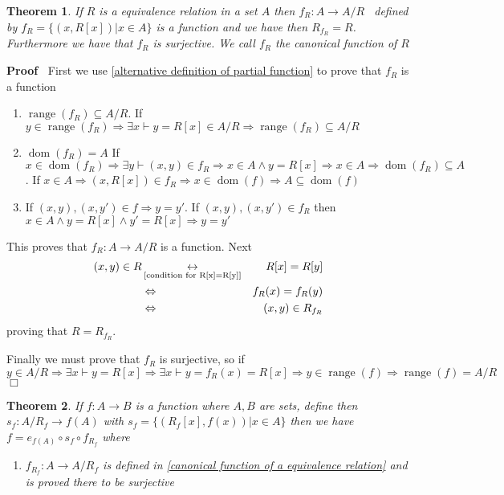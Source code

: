\documentclass{book}
\newcommand{\Leftrightarrowlim}{\mathop{\leftrightarrow}\limits}
\newcommand{\nobracket}{}
\newcommand{\tmop}[1]{\ensuremath{\operatorname{#1}}}
\newenvironment{proof}{\noindent\textbf{Proof\ }}{\hspace*{\fill}$\Box$\medskip}
\newtheorem{theorem}{Theorem}
\begin{document}
{{\begin{theorem}
  \label{canonical function of a equivalence relation}If $R$ is a equivalence
  relation in a set $A$ then $f_R : A \rightarrow A / R$ \ defined by $f_R =
  \{ (x, R [x]) | x \in A \nobracket \}$ is a function and we have then
  $R_{f_R} = R$. Furthermore we have that $f_R$ is surjective. We call $f_R$
  the canonical function of $R$
\end{theorem}

\begin{proof}
  First we use \ref{alternative definition of partial function} to prove that
  $f_R$ is a function
  \begin{enumerate}
    \item $\tmop{range} (f_R) \subseteq A / R$. If $y \in \tmop{range} (f_R)
    \Rightarrow \exists x \vdash y = R [x] \in A / R \Rightarrow \tmop{range}
    (f_R) \subseteq A / R$
    
    \item $\tmop{dom} (f_R) = A$ If $x \in \tmop{dom} (f_R) \Rightarrow
    \exists y \vdash (x, y) \in f_R \Rightarrow x \in A \wedge y = R [x]
    \Rightarrow x \in A \Rightarrow \tmop{dom} (f_R) \subseteq A$. If $x \in A
    \Rightarrow (x, R [x]) \in f_R \Rightarrow x \in \tmop{dom} (f)
    \Rightarrow A \subseteq \tmop{dom} (f)$
    
    \item If $(x, y), (x, y') \in f \Rightarrow y = y'$. If $(x, y), (x, y')
    \in f_R$ then $x \in A \wedge y = R [x] \wedge y' = R [x] \Rightarrow y =
    y'$
  \end{enumerate}
  This proves that $f_R : A \rightarrow A / R$ is a function. Next
  \begin{eqnarray*}
    (x, y) \in R & \Leftrightarrowlim_{\text{\ref{condition for R[x]=R[y]}}} &
    R [x] = R [y]\\
    & \Leftrightarrow & f_R (x) = f_R (y)\\
    & \Leftrightarrow & (x, y) \in R_{f_R}
  \end{eqnarray*}
  proving that $R = R_{f_R}$.
  
  Finally we must prove that $f_R $ is surjective, so if $y \in A / R
  \Rightarrow \exists x \vdash y = R [x] \Rightarrow \exists x \vdash y = f_R
  (x) = R [x] \Rightarrow y \in \tmop{range} (f) \Rightarrow \tmop{range} (f)
  = A / R$
\end{proof}

\begin{theorem}
  \label{canonical decomposition of a function}{}If $f : A \rightarrow B$ is a function where $A, B$ are sets,
  define then $s_f : A / R_f \rightarrow f (A)$ with $s_f = \{ (R_f [x], f
  (x)) | x \in A \nobracket \}$ then we have $f = e_{f (A)} \circ s_f \circ
  f_{R_f}$ where
  \begin{enumerate}
    \item $f_{R_f} : A \rightarrow A / R_f$ is defined in \ref{canonical
    function of a equivalence relation} and is proved there to be surjective
    

\end{enumerate}
\end{theorem}}}
\end{document}
